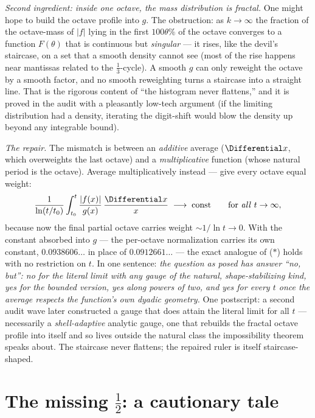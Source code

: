 \documentclass[11pt,oneside]{article}
\theoremstyle{remark}
\begin{document}
\emph{Second ingredient: inside one octave, the mass distribution is
fractal.}  One might hope to build the octave profile into $g$.  The
obstruction: as $k\to\infty$ the fraction of the octave-mass of
$|f|$ lying in the first $100\theta\%$ of the octave converges to a
function $F(\theta)$ that is continuous but \emph{singular} --- it
rises, like the devil's staircase, on a set that a smooth density
cannot see (most of the rise happens near mantissas related to the
$\tfrac13$-cycle).  A smooth $g$ can only reweight the octave by a
smooth factor, and no smooth reweighting turns a staircase into a
straight line.  That is the rigorous content of ``the histogram never
flattens,'' and it is proved in the audit with a pleasantly low-tech
argument (if the limiting distribution had a density, iterating the
digit-shift would blow the density up beyond any integrable bound).

\emph{The repair.}  The mismatch is between an \emph{additive} average
($\Differential x$, which overweights the last octave) and a
\emph{multiplicative} function (whose natural period is the octave).
Average multiplicatively instead --- give every octave equal weight:
\[
 \frac{1}{\ln(t/t_0)}\int_{t_0}^{t}\frac{|f(x)|}{g(x)}\,
 \frac{\Differential x}{x}
 \;\longrightarrow\;\text{const}
 \qquad\text{for \emph{all} } t\to\infty,
\]
because now the final partial octave carries weight
$\sim1/\ln t\to0$.  With the constant absorbed into $g$ --- the
per-octave normalization carries its own constant,
$0.0938606\ldots$ in place of $0.0912661\ldots$ --- the exact
analogue of ($\ast$) holds with no restriction on $t$.  In one
sentence: \emph{the question as posed has answer ``no, but'': no for
the literal limit with any gauge of the natural, shape-stabilizing
kind, yes for the bounded version, yes along powers of two, and yes
for every $t$ once the average respects the function's own dyadic
geometry.}  One postscript: a second audit wave later constructed a
gauge that does attain the literal limit for all $t$ --- necessarily a
\emph{shell-adaptive} analytic gauge, one that rebuilds the fractal
octave profile into itself and so lives outside the natural class the
impossibility theorem speaks about.  The staircase never flattens;
the repaired ruler is itself staircase-shaped.

\section{The missing \texorpdfstring{$\tfrac12$}{1/2}: a cautionary tale}
\label{sec:half}
\end{document}
